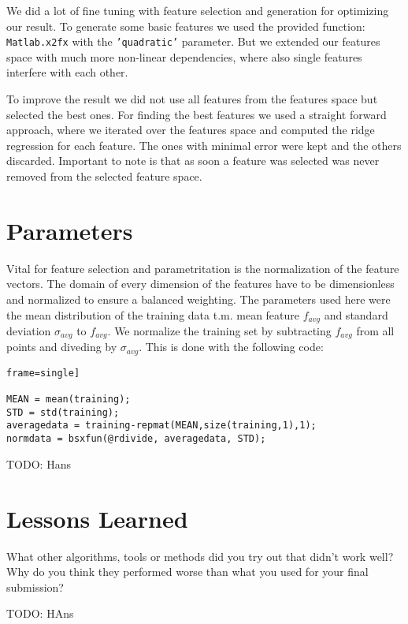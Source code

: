 \documentclass[a4paper, 11pt]{article}
\begin{document}
We did a lot of fine tuning with feature selection and generation for optimizing our result. To generate some basic features we used the provided function: \texttt{Matlab.x2fx} with the \texttt{'quadratic'} parameter. But we extended our features space with much more non-linear dependencies, where also single features interfere with each other.

To improve the result we did not use all features from the features space but selected the best ones. For finding the best features we used a straight forward approach, where we iterated over the features space and computed the ridge regression for each feature. The ones with minimal error were kept and the others discarded. Important to note is that as soon a feature was selected was never removed from the selected feature space.

\section{Parameters}

Vital for feature selection and parametritation is the normalization of the feature vectors. The domain of every dimension of the features have to be dimensionless and normalized 
to ensure a balanced weighting. The parameters used here were the mean distribution of the training data t.m. mean feature $f_{avg}$ and standard deviation $\sigma_{avg}$ to $f_{avg}$. We normalize the training set by subtracting $f_{avg}$ from all points and diveding by $\sigma_{avg}$. This is done with the following code:

\begin{lstlisting}frame=single]

MEAN = mean(training);
STD = std(training);
averagedata = training-repmat(MEAN,size(training,1),1);
normdata = bsxfun(@rdivide, averagedata, STD);
\end{lstlisting}

TODO: Hans

\section{Lessons Learned} What other algorithms, tools or methods did you try out that didn't work well?
Why do you think they performed worse than what you used for your final submission?

TODO: HAns
\end{document}
